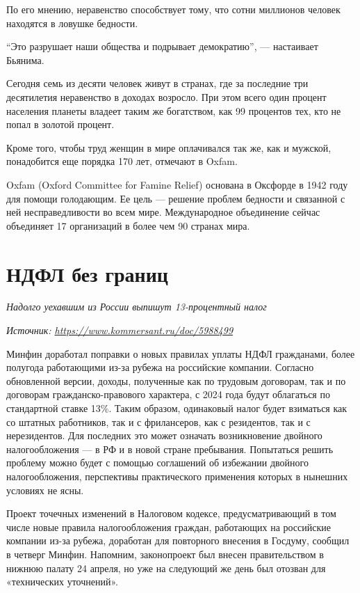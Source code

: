 По его мнению, неравенство способствует тому, что сотни миллионов человек находятся в ловушке бедности.

``Это разрушает наши общества и подрывает демократию'', --- настаивает Бьянима.

Сегодня семь из десяти человек живут в странах, где за последние три десятилетия неравенство в доходах возросло. При этом всего один процент населения планеты владеет таким же богатством, как 99 процентов тех, кто не попал в золотой процент.

Кроме того, чтобы труд женщин в мире оплачивался так же, как и мужской, понадобится еще порядка 170 лет, отмечают в Oxfam.

Oxfam (Oxford Committee for Famine Relief) основана в Оксфорде в 1942 году для помощи голодающим. Ее цель --- решение проблем бедности и связанной с ней несправедливости во всем мире. Международное объединение сейчас объединяет 17 организаций в более чем 90 странах мира.

\newpage
\section{НДФЛ без границ}
\textit{Надолго уехавшим из России выпишут 13-процентный налог}

{\it Источник: \url{https://www.kommersant.ru/doc/5988499}}

Минфин доработал поправки о новых правилах уплаты НДФЛ гражданами, более полугода работающими из-за рубежа на российские компании. Согласно обновленной версии, доходы, полученные как по трудовым договорам, так и по договорам гражданско-правового характера, с 2024 года будут облагаться по стандартной ставке 13\%. Таким образом, одинаковый налог будет взиматься как со штатных работников, так и с фрилансеров, как с резидентов, так и с нерезидентов. Для последних это может означать возникновение двойного налогообложения — в РФ и в новой стране пребывания. Попытаться решить проблему можно будет с помощью соглашений об избежании двойного налогообложения, перспективы практического применения которых в нынешних условиях не ясны.

Проект точечных изменений в Налоговом кодексе, предусматривающий в том числе новые правила налогообложения граждан, работающих на российские компании из-за рубежа, доработан для повторного внесения в Госдуму, сообщил в четверг Минфин. Напомним, законопроект был внесен правительством в нижнюю палату 24 апреля, но уже на следующий же день был отозван для «технических уточнений».

